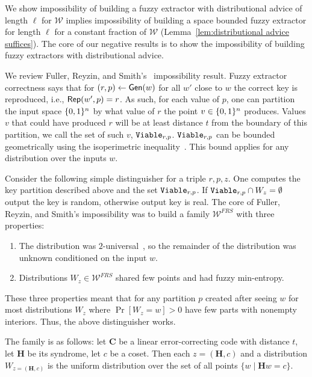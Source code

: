 We show impossibility of building a fuzzy extractor with distributional advice of length $\ell$ for $\mathcal{W}$ implies impossibility of building a space bounded fuzzy extractor for length $\ell$ for a constant fraction of $\mathcal{W}$ (Lemma~\ref{lem:distributional advice suffices}). 
The core of our negative results is to show the impossibility of building fuzzy extractors with distributional advice.   

We review Fuller, Reyzin, and Smith's~\cite{fuller2020fuzzy} impossibility result.
Fuzzy extractor correctness says that for $(r, p)\leftarrow {\ensuremath{\mathsf{Gen}}}(w)$ for all $w'$ close to $w$ the correct key is reproduced, i.e., ${\mathsf{Rep}}(w', p)=r$.  As such, for each value of $p$, one can partition the input space $\{0, 1\}^n$ by what value of $r$ the point  $v\in \{0, 1\}^n$ produces.  Values $v$ that could have produced  $r$ will be at least distance $t$ from the boundary of this partition, we call the set of such $v$, $\mathtt{Viable}_{r,p}$.  $\mathtt{Viable}_{r,p}$ can be bounded geometrically using the isoperimetric inequality~\cite{harper1966optimal}.  This bound applies for any distribution over the inputs $w$.

Consider the following simple distinguisher for a triple $r, p, z$.  One computes the key partition described above and the set $\mathtt{Viable}_{r,p}$. If $\mathtt{Viable}_{r,p} \cap W_z  = \emptyset$ output the key is random, otherwise output key is real. 
The core of Fuller, Reyzin, and Smith's impossibility was to build a family $\mathcal{W}^{FRS}$ with three properties:
\begin{enumerate}
\item The distribution was $2$-universal~\cite{carter1977universal}, so the remainder of the distribution was unknown conditioned on the input $w$. 
\item Distributions $W_z \in \mathcal{W}^{FRS}$ shared few points and had fuzzy min-entropy.
\end{enumerate}
These three properties meant that for any partition $p$ created after seeing $w$ for most distributions $W_z$ where $\Pr[W_z=w]>0$ have few parts with nonempty interiors. Thus, the above distinguisher works.

The family is as follows: let $\mathbf{C}$ be a linear error-correcting code with distance $t$, let $\mathbf{H}$ be its syndrome, let $c$ be a coset.  Then each $z = (\mathbf{H}, c)$ and a distribution $W_{z=(\mathbf{H}, c)}$ is the uniform distribution over  the set of all points $\{w \mid \mathbf{H} w = c\}$.

